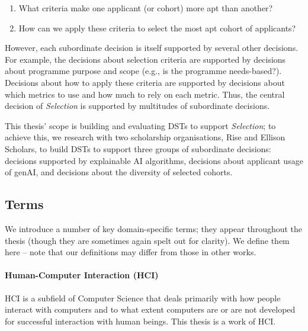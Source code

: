 \begin{enumerate}
    \item What criteria make one applicant (or cohort) more apt than another?
    \item How can we apply these criteria to select the most apt cohort of applicants?
\end{enumerate}

However, each subordinate decision is itself supported by several other decisions. For example, the decisions about selection criteria are supported by decisions about programme purpose and scope (e.g., is the programme needs-based?). Decisions about how to apply these criteria are supported by decisions about which metrics to use and how much to rely on each metric. Thus, the central decision of \emph{Selection} is supported by multitudes of subordinate decisions. 

This thesis' scope is building and evaluating DSTs to support \emph{Selection}; to achieve this, we research with two scholarship organisations, Rise and Ellison Scholars, to build DSTs to support three groups of subordinate decisions: decisions supported by explainable AI algorithms, decisions about applicant usage of genAI, and decisions about the diversity of selected cohorts.


\subsection{Terms}
We introduce a number of key domain-specific terms; they appear throughout the thesis (though they are sometimes again spelt out for clarity). We define them here – note that our definitions may differ from those in other works.

\paragraph{Human-Computer Interaction (HCI)}
HCI is a subfield of Computer Science that deals primarily with how people interact with computers and to what extent computers are or are not developed for successful interaction with human beings. This thesis is a work of HCI.

